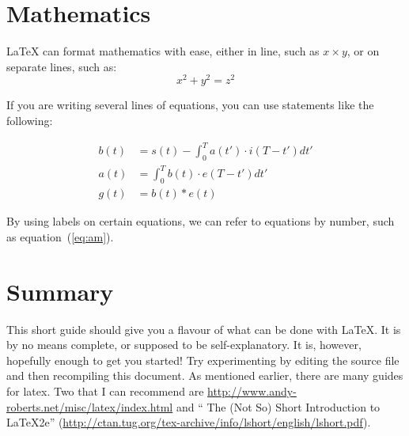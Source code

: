 \documentclass{article}
\providecommand*{\latex}{\LaTeX\xspace}
\begin{document}
\section{Mathematics}

\latex can format mathematics with ease, either in line, such as
$x \times y$, or on separate lines, such as:
\[ x^2 +y^2 = z^2 \]

If you are writing several lines of equations, you can use statements
like the following:

\begin{align}
  b(t) & = s(t) - \int_{0}^{T} a(t') \cdot i(T-t') dt'
  \\
  a(t) & = \int_{0}^{T} b(t) \cdot e(T-t') dt' \label{eq:am}
  \\
  g(t) & = b(t) \ast e(t) \nonumber
\end{align}

By using labels on certain equations, we can refer to equations by
number, such as equation~(\ref{eq:am}).

\section{Summary}
\label{sec:summary}
This short guide should give you a flavour of what can be done with
\latex.  It is by no means complete, or supposed to be
self-explanatory.  It is, however, hopefully enough to get you
started!  Try experimenting by editing the source file and then
recompiling this document.  As mentioned earlier, there are many
guides for latex.  Two that I can recommend are
\url{http://www.andy-roberts.net/misc/latex/index.html} and
`` The (Not So) Short Introduction to LaTeX2e''
(\url{http://ctan.tug.org/tex-archive/info/lshort/english/lshort.pdf}).





\end{document}
